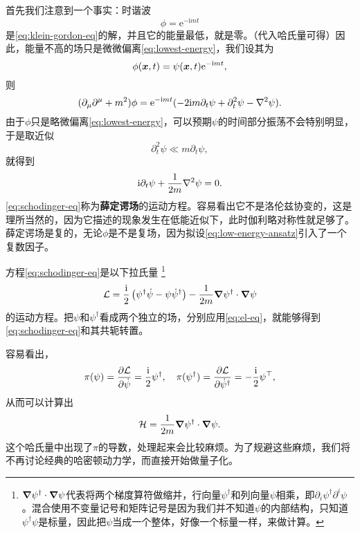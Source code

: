 \documentclass[hyperref, UTF8, a4paper]{ctexart}
\newcommand*{\ii}{\mathrm{i}}
\newcommand*{\ee}{\mathrm{e}}
\begin{document}
首先我们注意到一个事实：时谐波
\begin{equation}
    \phi = \ee^{- \ii m t}
    \label{eq:lowest-energy}
\end{equation}
是\eqref{eq:klein-gordon-eq}的解，并且它的能量最低，就是零。（代入哈氏量可得）因此，能量不高的场只是微微偏离\eqref{eq:lowest-energy}，我们设其为
\begin{equation}
    \phi(\vb*{x}, t) = \psi(\vb*{x}, t) \ee^{- \ii m t},
    \label{eq:low-energy-ansatz}
\end{equation}
则
\[
    (\partial_\mu \partial^\mu + m^2) \phi = \ee^{- \ii m t} (-2 \ii m \partial_t \psi + \partial_t^2 \psi - \laplacian{\psi}).
\]
由于$\phi$只是略微偏离\eqref{eq:lowest-energy}，可以预期$\psi$的时间部分振荡不会特别明显，于是取近似
\[
    \partial_t^2 \psi \ll m \partial_t \psi,
\]
就得到
\begin{equation}
    \ii \partial_t \psi + \frac{1}{2m} \laplacian{\psi} = 0.
    \label{eq:schodinger-eq}
\end{equation}
\eqref{eq:schodinger-eq}称为\textbf{薛定谔场}的运动方程。容易看出它不是洛伦兹协变的，这是理所当然的，因为它描述的现象发生在低能近似下，此时伽利略对称性就足够了。
薛定谔场是复的，无论$\phi$是不是复场，因为拟设\eqref{eq:low-energy-ansatz}引入了一个复数因子。

方程\eqref{eq:schodinger-eq}是以下拉氏量%
\footnote{$\grad{\psi}^\dagger \cdot \grad{\psi}$代表将两个梯度算符做缩并，行向量$\psi^\dagger$和列向量$\psi$相乘，即$\partial_i \psi^\dagger \partial^i \psi$。混合使用不变量记号和矩阵记号是因为我们并不知道$\psi$的内部结构，只知道$\psi^\dagger \psi$是标量，因此把$\psi$当成一个整体，好像一个标量一样，来做计算。}
\begin{equation}
    \mathcal{L} = \frac{\ii}{2} \left( \psi^\dagger \dot{\psi} - \psi \dot{\psi}^\dagger \right) - \frac{1}{2m} \grad{\psi^\dagger} \cdot \grad{\psi}
    \label{eq:schodinger-lagrangian}
\end{equation}
的运动方程。把$\psi$和$\psi^\dagger$看成两个独立的场，分别应用\eqref{eq:el-eq}，就能够得到\eqref{eq:schodinger-eq}和其共轭转置。

容易看出，
\[
    \pi(\psi) = \pdv{\mathcal{L}}{\dot{\psi}} = \frac{\ii}{2} \psi^\dagger, \quad \pi(\psi^\dagger) = \pdv{\mathcal{L}}{\dot{\psi}^\dagger} = - \frac{\ii}{2} \psi^\top,
\]
从而可以计算出
\begin{equation}
    \mathcal{H} = \frac{1}{2m} \grad{\psi^\dagger} \cdot \grad{\psi}.
\end{equation}
这个哈氏量中出现了$\pi$的导数，处理起来会比较麻烦。为了规避这些麻烦，我们将不再讨论经典的哈密顿动力学，而直接开始做量子化。
\end{document}
